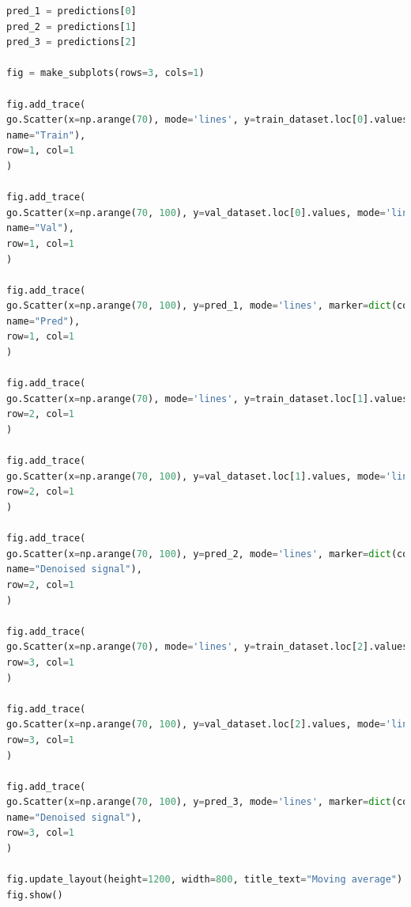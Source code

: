 \documentclass{article}
\begin{document}
\begin{latin}
\begin{lstlisting}[language=Python]
pred_1 = predictions[0]
pred_2 = predictions[1]
pred_3 = predictions[2]

fig = make_subplots(rows=3, cols=1)

fig.add_trace(
go.Scatter(x=np.arange(70), mode='lines', y=train_dataset.loc[0].values, marker=dict(color="dodgerblue"),
name="Train"),
row=1, col=1
)

fig.add_trace(
go.Scatter(x=np.arange(70, 100), y=val_dataset.loc[0].values, mode='lines', marker=dict(color="darkorange"),
name="Val"),
row=1, col=1
)

fig.add_trace(
go.Scatter(x=np.arange(70, 100), y=pred_1, mode='lines', marker=dict(color="seagreen"),
name="Pred"),
row=1, col=1
)

fig.add_trace(
go.Scatter(x=np.arange(70), mode='lines', y=train_dataset.loc[1].values, marker=dict(color="dodgerblue"), showlegend=False),
row=2, col=1
)

fig.add_trace(
go.Scatter(x=np.arange(70, 100), y=val_dataset.loc[1].values, mode='lines', marker=dict(color="darkorange"), showlegend=False),
row=2, col=1
)

fig.add_trace(
go.Scatter(x=np.arange(70, 100), y=pred_2, mode='lines', marker=dict(color="seagreen"), showlegend=False,
name="Denoised signal"),
row=2, col=1
)

fig.add_trace(
go.Scatter(x=np.arange(70), mode='lines', y=train_dataset.loc[2].values, marker=dict(color="dodgerblue"), showlegend=False),
row=3, col=1
)

fig.add_trace(
go.Scatter(x=np.arange(70, 100), y=val_dataset.loc[2].values, mode='lines', marker=dict(color="darkorange"), showlegend=False),
row=3, col=1
)

fig.add_trace(
go.Scatter(x=np.arange(70, 100), y=pred_3, mode='lines', marker=dict(color="seagreen"), showlegend=False,
name="Denoised signal"),
row=3, col=1
)

fig.update_layout(height=1200, width=800, title_text="Moving average")
fig.show()
\end{lstlisting}
\end{latin}
\pagebreak
\end{document}

